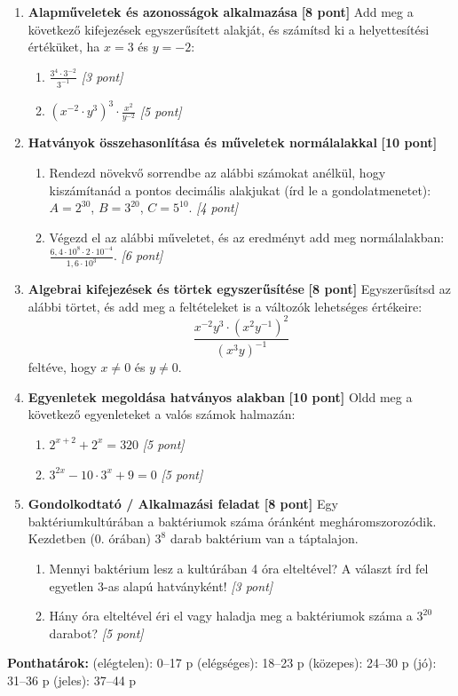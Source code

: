 \documentclass[a4paper,11pt]{article}
\begin{document}
\begin{enumerate}
  \item \textbf{Alapműveletek és azonosságok alkalmazása} \hfill \textbf{[8 pont]}
  Add meg a következő kifejezések egyszerűsített alakját, és számítsd ki a helyettesítési értéküket, ha $x = 3$ és $y = -2$:
  \begin{enumerate}
    \item $\frac{3^4 \cdot 3^{-2}}{3^{-1}}$ \hfill \textit{[3 pont]}
    \item $(x^{-2} \cdot y^3)^3 \cdot \frac{x^2}{y^{-2}}$ \hfill \textit{[5 pont]}
  \end{enumerate}

  \item \textbf{Hatványok összehasonlítása és műveletek normálalakkal} \hfill \textbf{[10 pont]}
  \begin{enumerate}
    \item Rendezd növekvő sorrendbe az alábbi számokat anélkül, hogy kiszámítanád a pontos decimális alakjukat (írd le a gondolatmenetet): 
    $A = 2^{30}$, $B = 3^{20}$, $C = 5^{10}$. \hfill \textit{[4 pont]}
    \item Végezd el az alábbi műveletet, és az eredményt add meg normálalakban: 
    $\frac{6,4 \cdot 10^8 \cdot 2 \cdot 10^{-4}}{1,6 \cdot 10^3}$. \hfill \textit{[6 pont]}
  \end{enumerate}

  \item \textbf{Algebrai kifejezések és törtek egyszerűsítése} \hfill \textbf{[8 pont]}
  Egyszerűsítsd az alábbi törtet, és add meg a feltételeket is a változók lehetséges értékeire:
  $$\frac{x^{-2} y^3 \cdot (x^2 y^{-1})^2}{(x^3 y)^{-1}}$$
  feltéve, hogy $x \neq 0$ és $y \neq 0$.

  \item \textbf{Egyenletek megoldása hatványos alakban} \hfill \textbf{[10 pont]}
  Oldd meg a következő egyenleteket a valós számok halmazán:
  \begin{enumerate}
    \item $2^{x+2} + 2^x = 320$ \hfill \textit{[5 pont]}
    \item $3^{2x} - 10 \cdot 3^x + 9 = 0$ \hfill \textit{[5 pont]}
  \end{enumerate}

  \item \textbf{Gondolkodtató / Alkalmazási feladat} \hfill \textbf{[8 pont]}
  Egy baktériumkultúrában a baktériumok száma óránként megháromszorozódik. Kezdetben (0. órában) $3^8$ darab baktérium van a táptalajon. 
  \begin{enumerate}
    \item Mennyi baktérium lesz a kultúrában 4 óra elteltével? A választ írd fel egyetlen 3-as alapú hatványként! \hfill \textit{[3 pont]}
    \item Hány óra elteltével éri el vagy haladja meg a baktériumok száma a $3^{20}$ darabot? \hfill \textit{[5 pont]}
  \end{enumerate}
\end{enumerate}

\vfill
\noindent
\begin{center}
\small
\textbf{Ponthatárok:}  (elégtelen): 0--17 p  (elégséges): 18--23 p  (közepes): 24--30 p  (jó): 31--36 p  (jeles): 37--44 p
\end{center}
\end{document}
